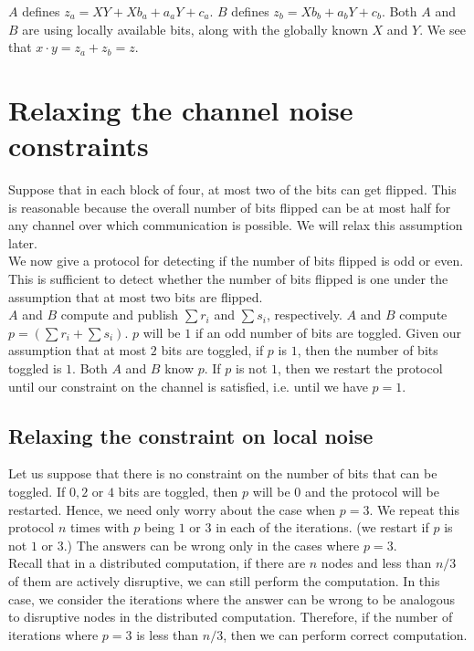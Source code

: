 $A$ defines $z_a = XY + X b_a + a_a Y + c_a$. $B$ defines $z_b = X b_b + a_b Y + c_b$. Both $A$ and $B$ are using locally available bits, along with the globally known $X$ and $Y$. We see that $x \cdot y = z_a + z_b = z$.

\section{Relaxing the channel noise constraints}
Suppose that in each block of four, at most two of the bits can get flipped. This is reasonable because the overall number of bits flipped can be at most half for any channel over which communication is possible. We will relax this assumption later.\\

We now give a protocol for detecting if the number of bits flipped is odd or even. This is sufficient to detect whether the number of bits flipped is one under the assumption that at most two bits are flipped.\\

$A$ and $B$ compute and publish $\sum r_i$ and $\sum s_i$, respectively. $A$ and $B$ compute $p = (\sum r_i + \sum s_i)$. $p$ will be $1$ if an odd number of bits are toggled. Given our assumption that at most $2$ bits are toggled, if $p$ is $1$, then the number of bits toggled is $1$. Both $A$ and $B$ know $p$. If $p$ is not $1$, then we restart the protocol until our constraint on the channel is satisfied, i.e. until we have $p = 1$.

\subsection{Relaxing the constraint on local noise}
Let us suppose that there is no constraint on the number of bits that can be toggled. If $0, 2$ or $4$ bits are toggled, then $p$ will be $0$ and the protocol will be restarted. Hence, we need only worry about the case when $p = 3$. We repeat this protocol $n$ times with $p$ being $1$ or $3$ in each of the iterations. (we restart if $p$ is not $1$ or $3$.) The answers can be wrong only in the cases where $p = 3$. \\

Recall that in a distributed computation, if there are $n$ nodes and less than $n/3$ of them are actively disruptive, we can still perform the computation. In this case, we consider the iterations where the answer can be wrong to be analogous to disruptive nodes in the distributed computation. Therefore, if the number of iterations where $p = 3$ is less than $n/3$, then we can perform correct computation. \\

